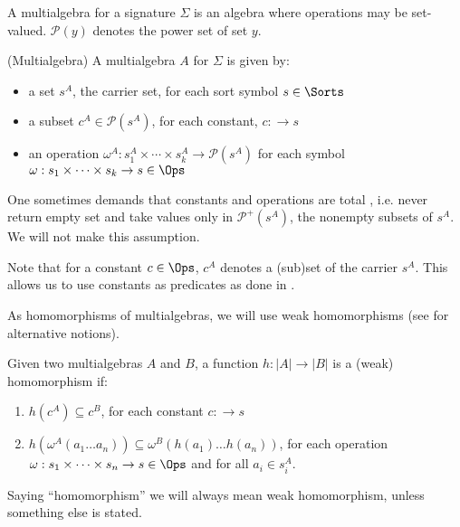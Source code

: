 A multialgebra for a signature $\Sigma$ is an algebra where operations may be
set-valued. ${\mathcal{P}}(y)$ denotes the power set of set $y$.

\begin{definition}\label{def:ma}
(Multialgebra) A multialgebra $A$ for $\Sigma$ is given by:
\begin{itemize}
\item  a set $s^A$, the carrier set, for each sort symbol $s\in\Sorts$
\item  a subset $ c^A \in {\mathcal{P}}(s^A)$, for each constant, $c:\to s$
\item an operation $\omega^A : s_1^A \times \cdots \times s_k^A \to {\mathcal{P}}(s^A)$
	for each symbol $\omega : s_1\times\cdots\times s_k \to s \in \Ops$
\end{itemize}
\end{definition}
One sometimes demands that constants and operations are total
\cite{multi,toplas}, i.e. never return empty set and take values only in
${\mathcal{P}}^+ (s^A)$, the nonempty subsets of $s^A$. We will not make this
assumption.%

Note that for a constant $c \in \Ops$, $c^A$ denotes a (sub)set of the
carrier $s^A$. This allows us to use constants as predicates as done in \cite{partial}. 

As homomorphisms of multialgebras, we will use weak homomorphisms (see
\cite{catrel} for alternative notions).
\begin{definition}Given two multialgebras $A$ and $B$, 
a function $h: |A| \to |B|$ is a (weak) homomorphism if:
\begin{enumerate}
\item $h(c^A) \subseteq c^B$, for each constant $c: \to s$ 
\item $h(\omega^A(a_1 \ldots a_n)) \subseteq\omega^B(h(a_1) \ldots h(a_n))$,
for each operation  $\omega:s_1\times\cdots\times s_n\to s\in\Ops$ and for all $a_i \in s_{i}^A$.
\end{enumerate}
\end{definition}
Saying ``homomorphism'' we will always mean weak homomorphism, unless
something else is stated.

